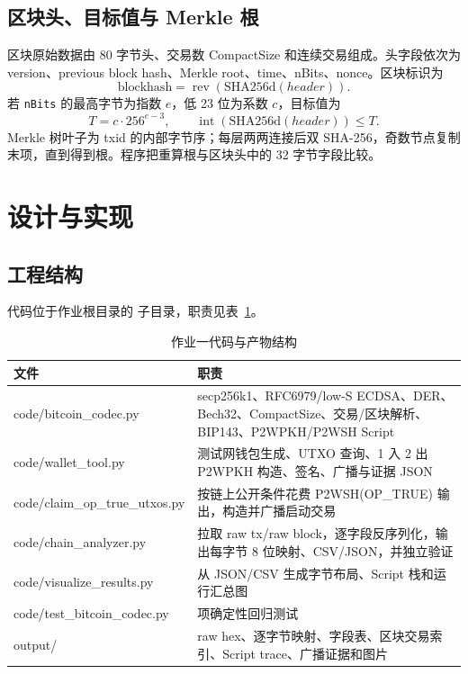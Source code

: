 \documentclass[UTF8,a4paper,zihao=-4]{ctexart}
\begin{document}
\subsection{区块头、目标值与 Merkle 根}

区块原始数据由 80 字节头、交易数 CompactSize 和连续交易组成。头字段依次为 version、previous block hash、Merkle root、time、nBits、nonce。区块标识为
\[
\mathrm{blockhash}=\operatorname{rev}(\mathrm{SHA256d}(header)).
\]
若 \texttt{nBits} 的最高字节为指数 $e$，低 23 位为系数 $c$，目标值为
\[
T=c\cdot 256^{e-3},\qquad \operatorname{int}(\mathrm{SHA256d}(header))\le T.
\]
Merkle 树叶子为 txid 的内部字节序；每层两两连接后双 SHA-256，奇数节点复制末项，直到得到根。程序把重算根与区块头中的 32 字节字段比较。

\section{设计与实现}

\subsection{工程结构}

代码位于作业根目录的  子目录，职责见表~\ref{tab:files}。

\begin{table}[H]
\centering
\caption{作业一代码与产物结构}
\label{tab:files}
\begin{tabularx}{\textwidth}{>{\ttfamily\small}p{} >{\raggedright\arraybackslash}X}
\toprule
文件 & 职责\\
\midrule
code/bitcoin\_codec.py & secp256k1、RFC6979/low-S ECDSA、DER、Bech32、CompactSize、交易/区块解析、BIP143、P2WPKH/P2WSH Script\\
code/wallet\_tool.py & 测试网钱包生成、UTXO 查询、1 入 2 出 P2WPKH 构造、签名、广播与证据 JSON\\
code/claim\_op\_true\_utxos.py & 按链上公开条件花费 P2WSH(OP\_TRUE) 输出，构造并广播启动交易\\
code/chain\_analyzer.py & 拉取 raw tx/raw block，逐字段反序列化，输出每字节 8 位映射、CSV/JSON，并独立验证\\
code/visualize\_results.py & 从 JSON/CSV 生成字节布局、Script 栈和运行汇总图\\
code/test\_bitcoin\_codec.py & 6 项确定性回归测试\\
output/ & raw hex、逐字节映射、字段表、区块交易索引、Script trace、广播证据和图片\\
\bottomrule
\end{tabularx}
\end{table}
\end{document}
